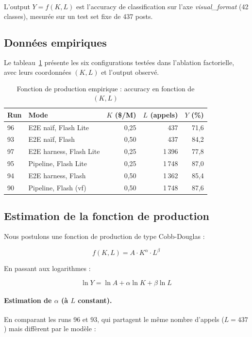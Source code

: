 L'output $Y = f(K, L)$ est l'accuracy de classification sur l'axe \textit{visual\_format} (42 classes), mesurée sur un test set fixe de 437 posts.

\subsection{Données empiriques}

Le tableau~\ref{tab:production} présente les six configurations testées dans l'ablation factorielle, avec leurs coordonnées $(K, L)$ et l'output observé.

\begin{table}[h]
\centering
\caption{Fonction de production empirique : accuracy en fonction de $(K, L)$}
\label{tab:production}
\begin{tabular}{llrrr}
\toprule
Run & Mode & $K$ (\$/M) & $L$ (appels) & $Y$ (\%) \\
\midrule
96  & E2E naïf, Flash Lite        & 0,25 & 437   & 71,6 \\
93  & E2E naïf, Flash             & 0,50 & 437   & 84,2 \\
97  & E2E harness, Flash Lite     & 0,25 & 1\,396 & 77,8 \\
95  & Pipeline, Flash Lite        & 0,25 & 1\,748 & 87,0 \\
94  & E2E harness, Flash          & 0,50 & 1\,362 & 85,4 \\
90  & Pipeline, Flash (vf)        & 0,50 & 1\,748 & 87,6 \\
\bottomrule
\end{tabular}
\end{table}

\subsection{Estimation de la fonction de production}

Nous postulons une fonction de production de type Cobb-Douglas :

\begin{equation}
f(K, L) = A \cdot K^{\alpha} \cdot L^{\beta}
\label{eq:cobb-douglas}
\end{equation}

En passant aux logarithmes :

\begin{equation}
\ln Y = \ln A + \alpha \ln K + \beta \ln L
\end{equation}

\paragraph{Estimation de $\alpha$ (à $L$ constant).} En comparant les runs 96 et 93, qui partagent le même nombre d'appels ($L = 437$) mais diffèrent par le modèle :

